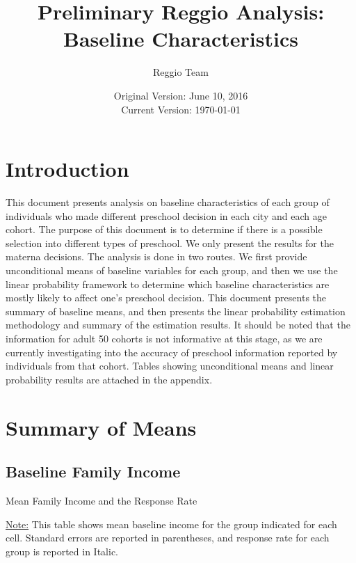 \documentclass[12pt]{article}
\begin{document}
\title{Preliminary Reggio Analysis: Baseline Characteristics}
\author{Reggio Team}
\date{Original Version: June 10, 2016 \\ Current Version: \today}
\maketitle 

\doublespacing
\section{Introduction}

This document presents analysis on baseline characteristics of each group of individuals who made different preschool decision in each city and each age cohort. The purpose of this document is to determine if there is a possible selection into different types of preschool. We only present the results for the materna decisions. The analysis is done in two routes. We first provide unconditional means of baseline variables for each group, and then we use the linear probability framework to determine which baseline characteristics are mostly likely to affect one's preschool decision. This document presents the summary of baseline means, and then presents the linear probability estimation methodology and summary of the estimation results. It should be noted that the information for adult 50 cohorts is not informative at this stage, as we are currently investigating into the accuracy of preschool information reported by individuals from that cohort. Tables showing unconditional means and linear probability results are attached in the appendix. 

\section{Summary of Means}
\subsection{Baseline Family Income}

\begin{table}[H]
\caption{Mean Family Income and the Response Rate} \label{tab:famincome}
\begin{center}
\scalebox{0.9}{

}
\end{center}
\begin{footnotesize}
\vspace{0.5mm} 

\underline{Note:} This table shows mean baseline income for the group indicated for each cell. Standard errors are reported in parentheses, and response rate for each group is reported in Italic. 
\end{footnotesize}
\end{table}
\end{document}
